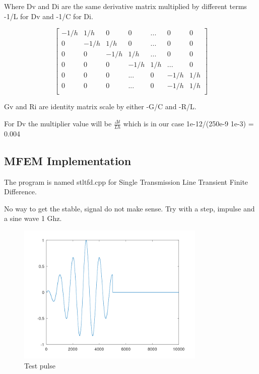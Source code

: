 \documentclass[12pt, letterpaper]{article}
\begin{document}
Where Dv and Di are the same derivative matrix multiplied by different terms -1/L for Dv and -1/C for Di.

\begin{equation}
	\begin{bmatrix}
	   -1/h & 1/h & 0 & 0 & ... &0 &0 \\
	   0 &-1/h & 1/h& 0 &... &0 &0 \\
	   0& 0& -1/h &1/h &... &0 &0 \\
	   0& 0& 0& -1/h &1/h & ... &0 \\
	   0& 0& 0&... &0 &-1/h &1/h  \\
	   0& 0& 0&... &0 & -1/h &1/h  \\
	\end{bmatrix}
\end{equation}

Gv and Ri are identity matrix scale by either -G/C and -R/L.

For Dv the multiplier value will be $\frac{\Delta t}{L h}$ which is in our case 1e-12/(250e-9 1e-3) = 0.004

\subsection{MFEM Implementation}

The program is named stltfd.cpp for Single Transmission Line Transient Finite Difference.

No way to get the stable, signal do not make sense. Try with a step, impulse and a sine wave 1 Ghz.

\begin{figure}[h]
	\centering
	\includegraphics[width=0.8\textwidth]{testpulse_1.png} %
	\caption{Test pulse}
	\label{fig:example}
\end{figure}
\end{document}
